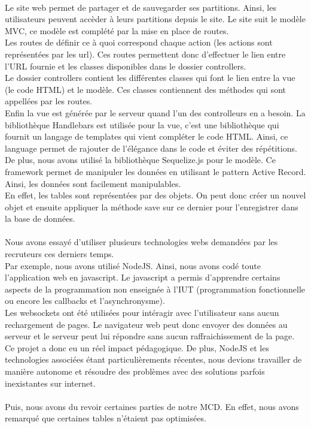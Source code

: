 \paragraph{}
Le site web permet de partager et de sauvegarder ses partitions.
Ainsi, les utilisateurs peuvent accèder à leurs partitions depuis le site.
Le site suit le modèle MVC, ce modèle est complété par la mise en place de routes. \\
Les routes de définir ce à quoi correspond chaque action (les actions sont représentées par les url). Ces routes permettent donc d'effectuer le lien entre l'URL fournie et les classes disponibles dans le dossier controllers. \\
Le dossier controllers contient les différentes classes qui font le lien entre la vue (le code HTML) et le modèle. Ces classes contiennent des méthodes qui sont appellées par les routes. \\
Enfin la vue est générée par le serveur quand l'un des controlleurs en a besoin. La bibliothèque Handlebars est utilisée pour la vue, c'est une bibliothèque qui fournit un langage de templates qui vient compléter le code HTML. Ainsi, ce language permet de rajouter de l'élégance dans le code et éviter des répétitions. \\
De plus, nous avons utilisé la bibliothèque Sequelize.js pour le modèle.
Ce framework permet de manipuler les données en utilisant le pattern Active Record. Ainsi, les données sont facilement manipulables. \\
En effet, les tables sont représentées par des objets. On peut donc créer un nouvel objet et ensuite appliquer la méthode save sur ce dernier pour l'enregistrer dans la base de données. \\
\paragraph{}
Nous avons essayé d'utiliser plusieurs technologies webs demandées par les recruteurs ces derniers temps. \\
Par exemple, nous avons utilisé NodeJS. Ainsi, nous avons codé toute l'application web en javascript. Le javascript a permis d'apprendre certains aspects de la programmation non enseignée à l'IUT (programmation fonctionnelle ou encore les callbacks et l'asynchronysme). \\
Les websockets ont été utilisées pour intéragir avec l'utilisateur sans aucun rechargement de pages. Le navigateur web peut donc envoyer des données au serveur et le serveur peut lui répondre sans aucun raffraichissement de la page. \\
Ce projet a donc eu un réel impact pédagogique. De plus, NodeJS et les technologies associées étant particulièrements récentes, nous devions travailler de manière autonome et résoudre des problèmes avec des solutions parfois inexistantes sur internet. \\
\\
Puis, nous avons du revoir certaines parties de notre MCD. 
En effet, nous avons remarqué que certaines tables n'étaient pas optimisées. 

